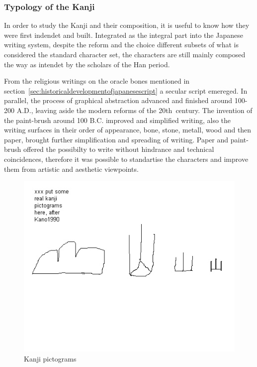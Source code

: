 \subsubsection{Typology of the Kanji}
\label{sec:typologyofthekanji}

In order to study the Kanji and their composition, it is useful to know how they
were first indendet and built. Integrated as the integral part into the Japanese
writing system, despite the reform and the choice different subsets of what is 
considered the standard character set, the characters are still mainly composed
the way as intendet by the scholars of the Han period.

From the religious writings on the oracle bones mentioned in 
section~\ref{sec:historicaldevelopmentofjapanesescript} a secular script 
emereged. In parallel, the process of graphical abstraction advanced and
finished around 100-200 A.D., leaving aside the modern reforms of the 
20th~century. The invention of the paint-brush around 100 B.C. improved and 
simplified writing, also the writing surfaces in their order of appearance,
bone, stone, metall, wood and then paper, brought further simplification and
spreading of writing. Paper and paint-brush offered the possibilty to write
without hindrance and technical coincidences, therefore it was possible to
standartise the characters and improve them from artistic and aesthetic 
viewpoints.

\begin{figure}[htbp]
\includegraphics[scale=0.5]{images/kanjipictograms.png}
\caption{Kanji pictograms}
\label{fig:kanjipictograms}
\end{figure}

